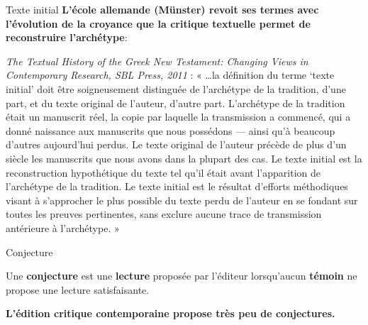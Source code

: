 \documentclass[11pt]{beamer}
\begin{document}
\begin{frame}{Texte initial}
\textbf{L'école allemande (Münster) revoit ses termes avec l'évolution de la croyance que la critique textuelle permet de reconstruire l'archétype}:

\begin{exampleblock}{}
\emph{The Textual History of the Greek New Testament: Changing Views in Contemporary Research, SBL Press, 2011} :
    « …la définition du terme ‘texte initial’ doit être soigneusement distinguée de l’archétype de la tradition, d'une part, et du texte original de l’auteur, d'autre part. L’archétype de la tradition était un manuscrit réel, la copie par laquelle la transmission a commencé, qui a donné naissance aux manuscrits que nous possédons — ainsi qu’à beaucoup d’autres aujourd’hui perdus. Le texte original de l’auteur précède de plus d’un siècle les manuscrits que nous avons dans la plupart des cas. Le texte initial est la reconstruction hypothétique du texte tel qu’il était avant l’apparition de l’archétype de la tradition. Le texte initial est le résultat d’efforts méthodiques visant à s’approcher le plus possible du texte perdu de l’auteur en se fondant sur toutes les preuves pertinentes, sans exclure aucune trace de transmission antérieure à l’archétype. »  
\end{exampleblock}
\end{frame}

\begin{frame}{Conjecture}

\begin{alertblock}{}
    Une \textbf{conjecture} est une \textbf{lecture} proposée par l'éditeur lorsqu'aucun \textbf{témoin} ne propose une lecture satisfaisante.
\end{alertblock}

\textbf{L'édition critique contemporaine propose très peu de conjectures.}

\end{frame}
\end{document}
